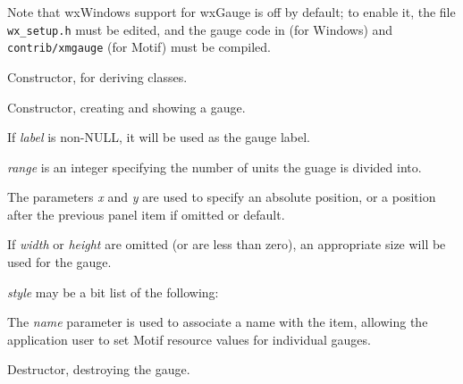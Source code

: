 Note that wxWindows support for wxGauge is off by default; to enable it,
the file {\tt wx\_setup.h} must be edited, and the gauge code in
 (for Windows) and {\tt contrib/xmgauge} (for Motif)
must be compiled.

\label{gauge}


Constructor, for deriving classes.


Constructor, creating and showing a gauge.

If {\it label} is non-NULL, it will be used as the gauge label.

{\it range} is an integer specifying the number of units the
guage is divided into.

The parameters {\it x} and {\it y} are used to specify an absolute
position, or a position after the previous panel item if omitted or
default.

If {\it width} or {\it height} are omitted (or are less than zero), an
appropriate size will be used for the gauge.

{\it style} may be a bit list of the following:

\begin{twocollist}\itemsep=0pt
\end{twocollist}

The {\it name} parameter is used to associate a name with the item,
allowing the application user to set Motif resource values for
individual gauges.



Destructor, destroying the gauge.



